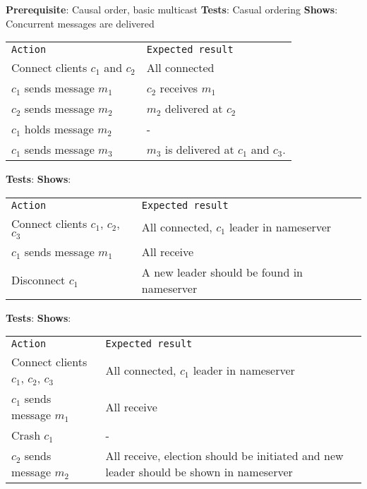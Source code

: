 	\textbf{Prerequisite}: Causal order, basic multicast
	\textbf{Tests}: Casual ordering
	\textbf{Shows}: Concurrent messages are delivered

	\begin{tabular}{ll}
		\texttt{Action} & \texttt{Expected result} \\
		Connect clients $c_1$ and $c_2$ & All connected\\
		$c_1$ sends message $m_1$ & $c_2$ receives $m_1$\\
		$c_2$ sends message $m_2$ & $m_2$ delivered at $c_2$ \\
		$c_1$ holds message $m_2$ & -\\
		$c_1$ sends message $m_3$ & $m_3$ is delivered at $c_1$ and $c_3$. \\
	\end{tabular}




	\textbf{Tests}:
	\textbf{Shows}:

	\begin{tabular}{ll}
		\texttt{Action} & \texttt{Expected result} \\
		Connect clients $c_1$, $c_2$, $c_3$ & All connected, $c_1$ leader in nameserver \\
		$c_1$ sends message $m_1$ & All receive \\
		Disconnect $c_1$ & A new leader should be found in nameserver \\
	\end{tabular}

	\textbf{Tests}:
	\textbf{Shows}:

	\begin{tabular}{ll}
		\texttt{Action} & \texttt{Expected result} \\
		Connect clients $c_1$, $c_2$, $c_3$ & All connected, $c_1$ leader in nameserver \\
		$c_1$ sends message $m_1$ & All receive \\
		Crash $c_1$ & - \\
		$c_2$ sends message $m_2$ & All receive, election should be initiated and new leader should be shown in nameserver \\
	\end{tabular}







